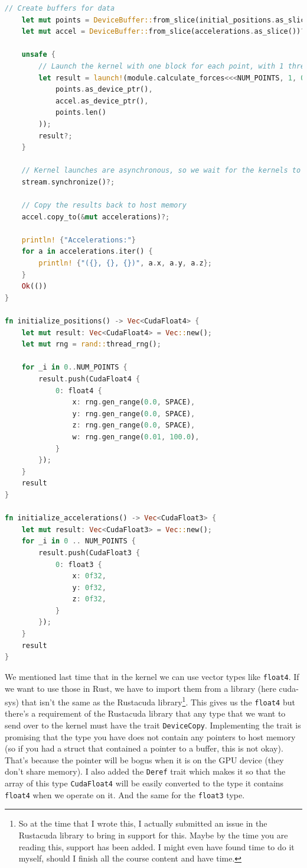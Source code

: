 \documentclass[a4paper]{report}
\begin{document}
\begin{lstlisting}[language=Rust]
    // Create buffers for data
    let mut points = DeviceBuffer::from_slice(initial_positions.as_slice())?;
    let mut accel = DeviceBuffer::from_slice(accelerations.as_slice())?;

    unsafe {
        // Launch the kernel with one block for each point, with 1 thread each, no dynamic shared memory on `stream`.
        let result = launch!(module.calculate_forces<<<NUM_POINTS, 1, 0, stream>>>(
            points.as_device_ptr(),
            accel.as_device_ptr(),
            points.len()
        ));
        result?;
    }

    // Kernel launches are asynchronous, so we wait for the kernels to finish executing.
    stream.synchronize()?;

    // Copy the results back to host memory
    accel.copy_to(&mut accelerations)?;

    println! {"Accelerations:"}
    for a in accelerations.iter() {
        println! {"({}, {}, {})", a.x, a.y, a.z};
    }
    Ok(())
}

fn initialize_positions() -> Vec<CudaFloat4> {
    let mut result: Vec<CudaFloat4> = Vec::new();
    let mut rng = rand::thread_rng();

    for _i in 0..NUM_POINTS {
        result.push(CudaFloat4 {
            0: float4 {
                x: rng.gen_range(0.0, SPACE),
                y: rng.gen_range(0.0, SPACE),
                z: rng.gen_range(0.0, SPACE),
                w: rng.gen_range(0.01, 100.0),
            }
        });
    }
    result
}

fn initialize_accelerations() -> Vec<CudaFloat3> {
    let mut result: Vec<CudaFloat3> = Vec::new();
    for _i in 0 .. NUM_POINTS {
        result.push(CudaFloat3 {
            0: float3 {
                x: 0f32,
                y: 0f32,
                z: 0f32,
            }
        });
    }
    result
}
\end{lstlisting}

We mentioned last time that in the kernel we can use vector types like \texttt{float4}. If we want to use those in Rust, we have to import them from a library (here cuda-sys) that isn't the same as the Rustacuda library\footnote{So at the time that I wrote this, I actually submitted an issue in the Rustacuda library to bring in support for this. Maybe by the time you are reading this, support has been added. I might even have found time to do it myself, should I finish all the course content and have time.}. This gives us the \texttt{float4} but there's a requirement of the Rustacuda library that any type that we want to send over to the kernel must have the trait \texttt{DeviceCopy}. Implementing the trait is promising that the type you have does not contain any pointers to host memory (so if you had a struct that contained a pointer to a buffer, this is not okay). That's because the pointer will be bogus when it is on the GPU device (they don't share memory). I also added the \texttt{Deref} trait which makes it so that the array of this type \texttt{CudaFloat4} will be easily converted to the type it contains \texttt{float4} when we operate on it. And the same for the \texttt{float3} type.
\end{document}

